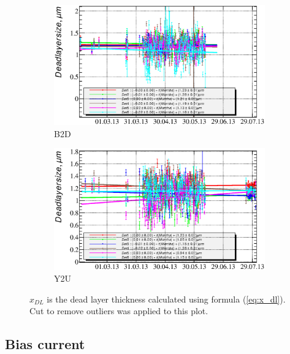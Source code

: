 \documentclass[a4paper,12pt]{article}
\begin{document}
\newcommand\xdllabel{$x_{DL}$ is the dead layer thickness calculated using formula (\ref{eq:x_dl}). Cut to remove
outliers was applied to this plot.}
\begin{figure}[p]
\begin{subfigure}[b]{0.5\textwidth}
\includegraphics[width=\textwidth]{gfx/run13_alpha_study/B2D/c_chDeadLayerSize_by_day_B2D.eps}
\caption{B2D}
\end{subfigure}
%
\begin{subfigure}[b]{0.5\textwidth}
\includegraphics[width=\textwidth]{gfx/run13_alpha_study/Y2U/c_chDeadLayerSize_by_day_Y2U.eps}
\caption{Y2U}
\end{subfigure}
\caption{\xdllabel}
\label{fig:x_dl}
\end{figure}


\subsection{Bias current}

\end{document}
